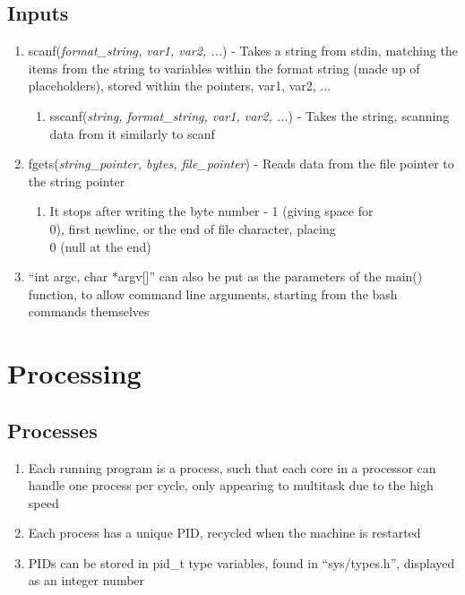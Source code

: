 \documentclass[11 pt, twoside]{article}
\begin{document}
\subsection{Inputs}
\begin{enumerate}
\item scanf(\textit{format\_string, var1, var2, ...}) - Takes a string from stdin, matching the items from the string to variables within the format string (made up of placeholders), stored within the pointers, var1, var2, ...
\begin{enumerate}
\item sscanf(\textit{string, format\_string, var1, var2, ...}) - Takes the string, scanning data from it similarly to scanf
\end{enumerate}
\item fgets(\textit{string\_pointer, bytes, file\_pointer}) - Reads data from the file pointer to the string pointer
\begin{enumerate}
\item It stops after writing the byte number - 1 (giving space for \\0), first newline, or the end of file character, placing \\0 (null at the end)
\end{enumerate}
\item ``int argc, char *argv[]'' can also be put as the parameters of the main() function, to allow command line arguments, starting from the bash commands themselves
\end{enumerate}

\section{Processing}
\subsection{Processes}
\begin{enumerate}
\item Each running program is a process, such that each core in a processor can handle one process per cycle, only appearing to multitask due to the high speed
\item Each process has a unique PID, recycled when the machine is restarted
\item PIDs can be stored in pid\_t type variables, found in ``sys/types.h'', displayed as an integer number
\end{enumerate}
\end{document}
